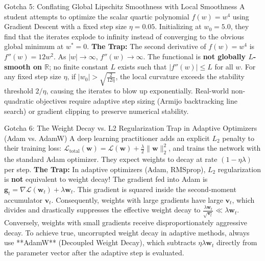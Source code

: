 \begin{trapbox}{Gotcha 5: Conflating Global Lipschitz Smoothness with Local Smoothness}
A student attempts to optimize the scalar quartic polynomial $f(w) = w^4$ using Gradient Descent with a fixed step size $\eta = 0.05$. Initializing at $w_0 = 5.0$, they find that the iterates explode to infinity instead of converging to the obvious global minimum at $w^* = 0$.
\tcblower
\textbf{The Trap:} The second derivative of $f(w) = w^4$ is $f''(w) = 12w^2$. As $|w| \to \infty$, $f''(w) \to \infty$. The functional is \textbf{not globally $L$-smooth on $\mathbb{R}$}; no finite constant $L$ exists such that $|f''(w)| \le L$ for all $w$. 
For any fixed step size $\eta$, if $|w_0| > \sqrt{\frac{2}{12\eta}}$, the local curvature exceeds the stability threshold $2/\eta$, causing the iterates to blow up exponentially. Real-world non-quadratic objectives require adaptive step sizing (Armijo backtracking line search) or gradient clipping to preserve numerical stability.
\end{trapbox}

\begin{trapbox}{Gotcha 6: The Weight Decay vs. L2 Regularization Trap in Adaptive Optimizers (Adam vs. AdamW)}
A deep learning practitioner adds an explicit $L_2$ penalty to their training loss: $\mathcal{L}_{\text{total}}(\mathbf{w}) = \mathcal{L}(\mathbf{w}) + \frac{\lambda}{2}\|\mathbf{w}\|_2^2$, and trains the network with the standard Adam optimizer. They expect weights to decay at rate $(1 - \eta \lambda)$ per step.
\tcblower
\textbf{The Trap:} In adaptive optimizers (Adam, RMSprop), $L_2$ regularization is \textbf{not} equivalent to weight decay! The gradient fed into Adam is $\mathbf{g}_t = \nabla \mathcal{L}(\mathbf{w}_t) + \lambda \mathbf{w}_t$. This gradient is squared inside the second-moment accumulator $\mathbf{v}_t$.
Consequently, weights with large gradients have large $\mathbf{v}_t$, which divides and drastically suppresses the effective weight decay to $\frac{\lambda \mathbf{w}_t}{\sqrt{\mathbf{v}_t}} \ll \lambda \mathbf{w}_t$. Conversely, weights with small gradients receive disproportionately aggressive decay.
To achieve true, uncorrupted weight decay in adaptive methods, always use **AdamW** (Decoupled Weight Decay), which subtracts $\eta \lambda \mathbf{w}_t$ directly from the parameter vector after the adaptive step is evaluated.
\end{trapbox}

